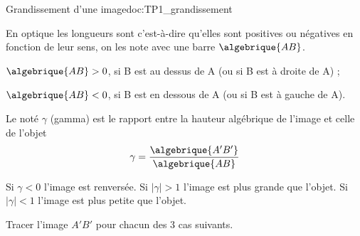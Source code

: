 \begin{doc}{Grandissement d'une image}{doc:TP1_grandissement}
  
  \begin{importants}
    En optique les longueurs sont  c'est-à-dire qu'elles sont positives ou négatives en fonction de leur sens, on les note avec une barre $\algebrique{AB}$.
  \end{importants}
  \begin{listePoints}
    \item $\algebrique{AB} > 0$, si B est au dessus de A (ou si B est à droite de A) ;
    \item $\algebrique{AB} < 0$, si B est en dessous de A (ou si B est à gauche de A).
  \end{listePoints}
  
  \begin{importants}
    Le  noté $\gamma$ (gamma) est le rapport entre la hauteur algébrique de l'image et celle de l'objet
    \begin{equation*}
      \gamma = \dfrac{\algebrique{A'B'}}{\algebrique{AB}}
    \end{equation*}
  \end{importants}
  Si $\gamma < 0$ l'image est renversée.
  Si $|\gamma| > 1$ l'image est plus grande que l'objet. 
  Si $|\gamma| < 1$ l'image est plus petite que l'objet.
\end{doc}


\nomPrenomClasse

\numeroQuestion
Tracer l'image $A'B'$ pour chacun des 3 cas suivants.

\begin{center}
  
  \vspace*{24pt}
  
  \vspace*{24pt}
  
\end{center}




